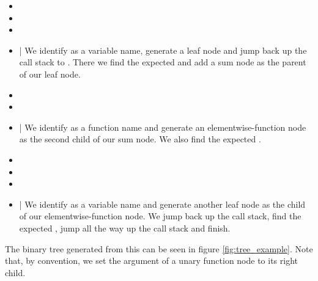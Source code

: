 \documentclass[12pt, a4paper]{report}
\begin{document}
\begin{itemize}
    \setlength\itemsep{0.01em}
    \item {}
    \item {}
    \item {}
    \item {} | We identify  as a variable name, generate a leaf node and jump back up the call stack to . There we find the expected  and add a sum node as the parent of our leaf node.
    \item {}
    \item {}
    \item {} | We identify  as a function name and generate an elementwise-function node as the second child of our sum node. We also find the expected .
    \item {}
    \item {}
    \item {}
    \item {} | We identify  as a variable name and generate another leaf node as the child of our elementwise-function node. We jump back up the call stack, find the expected , jump all the way up the call stack and finish.
\end{itemize}

The binary tree generated from this can be seen in figure \ref{fig:tree_example}.
Note that, by convention, we set the argument of a unary function node to its right child.
\end{document}

